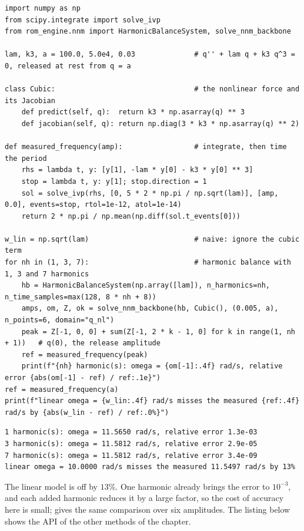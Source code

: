 \begin{lstlisting}[caption={A cubic oscillator: the linear frequency, a measured period and harmonic balance with 1, 3 and 7 harmonics (run with the package on the path).},label={lst:ni-try}]
import numpy as np
from scipy.integrate import solve_ivp
from rom_engine.nnm import HarmonicBalanceSystem, solve_nnm_backbone

lam, k3, a = 100.0, 5.0e4, 0.03              # q'' + lam q + k3 q^3 = 0, released at rest from q = a

class Cubic:                                 # the nonlinear force and its Jacobian
    def predict(self, q):  return k3 * np.asarray(q) ** 3
    def jacobian(self, q): return np.diag(3 * k3 * np.asarray(q) ** 2)

def measured_frequency(amp):                 # integrate, then time the period
    rhs = lambda t, y: [y[1], -lam * y[0] - k3 * y[0] ** 3]
    stop = lambda t, y: y[1]; stop.direction = 1
    sol = solve_ivp(rhs, [0, 5 * 2 * np.pi / np.sqrt(lam)], [amp, 0.0], events=stop, rtol=1e-12, atol=1e-14)
    return 2 * np.pi / np.mean(np.diff(sol.t_events[0]))

w_lin = np.sqrt(lam)                         # naive: ignore the cubic term
for nh in (1, 3, 7):                         # harmonic balance with 1, 3 and 7 harmonics
    hb = HarmonicBalanceSystem(np.array([lam]), n_harmonics=nh, n_time_samples=max(128, 8 * nh + 8))
    amps, om, Z, ok = solve_nnm_backbone(hb, Cubic(), (0.005, a), n_points=6, domain="q_nl")
    peak = Z[-1, 0, 0] + sum(Z[-1, 2 * k - 1, 0] for k in range(1, nh + 1))   # q(0), the release amplitude
    ref = measured_frequency(peak)
    print(f"{nh} harmonic(s): omega = {om[-1]:.4f} rad/s, relative error {abs(om[-1] - ref) / ref:.1e}")
ref = measured_frequency(a)
print(f"linear omega = {w_lin:.4f} rad/s misses the measured {ref:.4f} rad/s by {abs(w_lin - ref) / ref:.0%}")
\end{lstlisting}

\begin{lstlisting}[numbers=none,language={},keywordstyle={},commentstyle={},frame=single,aboveskip=2pt]
1 harmonic(s): omega = 11.5650 rad/s, relative error 1.3e-03
3 harmonic(s): omega = 11.5812 rad/s, relative error 2.9e-05
7 harmonic(s): omega = 11.5812 rad/s, relative error 3.4e-09
linear omega = 10.0000 rad/s misses the measured 11.5497 rad/s by 13%
\end{lstlisting}

The linear model is off by $13\%$. One harmonic already brings the error to $10^{-3}$, and each added harmonic reduces it by a large factor, so the cost of accuracy here is small;  gives the same comparison over six amplitudes. The listing below shows the API of the other methods of the chapter.

